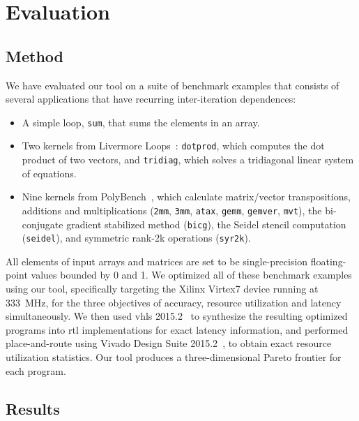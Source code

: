 \section{Evaluation}
\label{lo:sec:results}

\newcommand\redcircle{%
\begin{tikzpicture}\draw[red] (0,0) circle (1mm);\end{tikzpicture}}

\subsection{Method}
We have evaluated our tool on a suite of benchmark examples that consists of
several applications that have recurring inter-iteration dependences:
\begin{itemize}

\item A simple loop, \verb|sum|, that sums the elements in an array.

\item Two kernels from Livermore Loops~\cite{livermore}: \verb|dotprod|, which
computes the dot product of two vectors, and \verb|tridiag|, which solves a
tridiagonal linear system of equations.

\item Nine kernels from PolyBench~\cite{polybench}, which calculate
matrix/vector transpositions, additions and multiplications (\verb|2mm|,
\verb|3mm|, \verb|atax|, \verb|gemm|, \verb|gemver|, \verb|mvt|), the
bi-conjugate gradient stabilized method (\verb|bicg|), the Seidel stencil
computation (\verb|seidel|), and symmetric rank-2k operations
(\verb|syr2k|).

\end{itemize}

All elements of input arrays and matrices are set to be single-precision
floating-point values bounded by 0 and 1.  We optimized all of these benchmark
examples using our tool, specifically targeting the Xilinx Virtex7 device
running at 333~MHz, for the three objectives of accuracy, resource utilization
and latency simultaneously.  We then used \gls{vhls} 2015.2~\cite{vivado_hls}
to synthesize the resulting optimized programs into \gls{rtl} implementations
for exact latency information, and performed place-and-route using Vivado
Design Suite 2015.2~\cite{vivado_ds}, to obtain exact resource utilization
statistics.  Our tool produces a three-dimensional Pareto frontier for each
program.

\subsection{Results}

